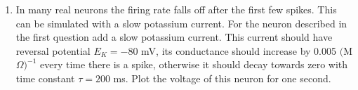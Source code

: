 \documentclass[11pt,a4paper]{scrartcl}
\begin{document}
\begin{enumerate}
\item In many real neurons the firing rate falls off after the first few spikes. This can be simulated with a slow potassium current. For the neuron described in the first question add a slow potassium current. This current should have reversal potential $E_K=-80$ mV, its conductance should increase by 0.005 $($M$\Omega)^{-1}$ every time there is a spike, otherwise it should decay towards zero with time constant $\tau=200$ ms. Plot the voltage of this neuron for one second.

\end{enumerate}
\end{document}
